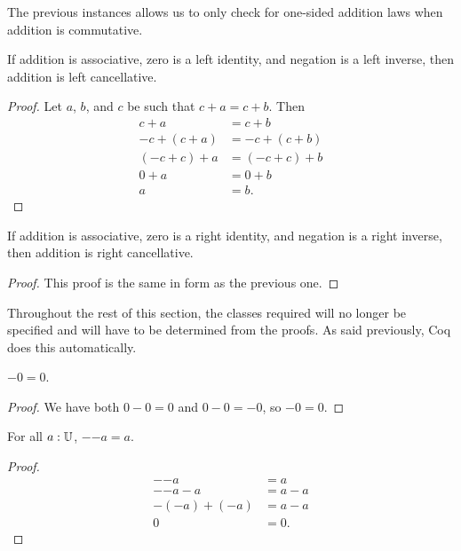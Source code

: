 \documentclass[../math.tex]{subfiles}
\begin{document}
The previous instances allows us to only check for one-sided addition laws when
addition is commutative.

\begin{instance} \label{plus-linv-lcancel}
    If addition is associative, zero is a left identity, and negation is a left
    inverse, then addition is left cancellative.
\end{instance}
\begin{proof}
    Let $a$, $b$, and $c$ be such that $c + a = c + b$.  Then
    \begin{align*}
        c + a &= c + b \\
        -c + (c + a) &= -c + (c + b) \\
        (-c + c) + a &= (-c + c) + b \\
        0 + a &= 0 + b \\
        a &= b.
    \end{align*}
\end{proof}

\begin{instance} \label{plus-rinv-rcancel}
    If addition is associative, zero is a right identity, and negation is a
    right inverse, then addition is right cancellative.
\end{instance}
\begin{proof}
    This proof is the same in form as the previous one.
\end{proof}

Throughout the rest of this section, the classes required will no longer be
specified and will have to be determined from the proofs.  As said previously,
Coq does this automatically.

\begin{theorem}
    $-0 = 0$.
\end{theorem}
\begin{proof}
    We have both $0 - 0 = 0$ and $0 - 0 = -0$, so $-0 = 0$.
\end{proof}

\begin{theorem}
    For all $a : \mathbb{U}$, $-{-a} = a$.
\end{theorem}
\begin{proof}
    \begin{align*}
        -{-a} &= a \\
        -{-a} - a &= a - a \\
        -(-a) + (-a) &= a - a \\
        0 &= 0.
    \end{align*}
\end{proof}
\end{document}
